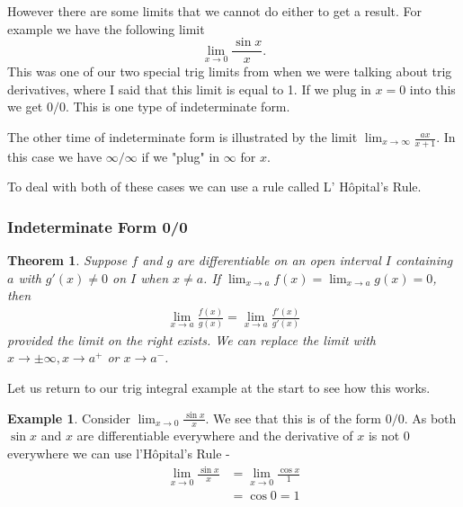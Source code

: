 \documentclass[12pt,reqno]{article}
\newtheorem{Theorem}{Theorem}
\theoremstyle{definition}
\newtheorem*{Example}{Example}
\begin{document}
However there are some limits that we cannot do either to get a result. For example we have the following limit $$\lim_{x \to 0} \frac{\sin x}{x}.$$ This was one of our two special trig limits from when we were talking about trig derivatives, where I said that this limit is equal to 1. If we plug in $x = 0$ into this we get $0/0$. This is one type of indeterminate form.

The other time of indeterminate form is illustrated by the limit $\lim_{x \to \infty} \frac{a x}{x + 1}$. In this case we have $\infty/\infty$ if we "plug" in $\infty$ for $x$. 

To deal with both of these cases we can use a rule called L' H\^{o}pital's Rule. 

\subsubsection{Indeterminate Form 0/0}

\begin{Theorem}
	Suppose $f$ and $g$ are differentiable on an open interval $I$ containing $a$ with $g'(x) \neq 0$ on $I$ when $x \neq a$. If $\lim_{x \to a }f(x) = \lim_{x \to a} g(x) = 0$, then 
	\begin{align*}
		\lim_{x\to a} \frac{f(x)}{g(x)} = \lim_{ x\to a} \frac{f'(x)}{g'(x)}
	\end{align*}
	provided the limit on the right exists. We can replace the limit with $x\to \pm \infty, x\to a^+$ or $x \to a^-$. 
\end{Theorem}

Let us return to our trig integral example at the start to see how this works. 
\begin{Example}
	Consider $\lim_{x \to 0} \frac{\sin x}{x}$. We see that this is of the form $0/0$. As both $\sin x$ and $x$ are differentiable everywhere and the derivative of $x$ is not 0 everywhere we can use l'H\^{o}pital's Rule - 
	\begin{align*}
		\lim_{x\to 0} \frac{\sin x}{x} &= \lim_{x\to 0} \frac{\cos x}{1} \\
					&= \cos 0 = 1
	\end{align*}
\end{Example}
\end{document}
